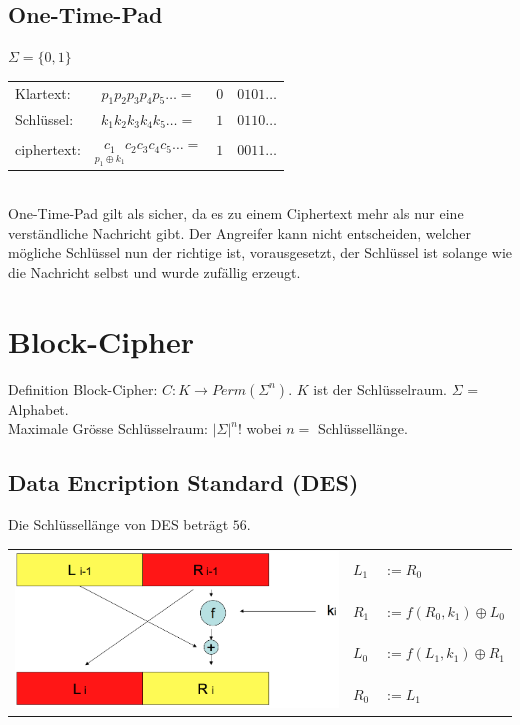 \documentclass[10pt]{article}
\newcommand{\Unten}[2]{\underset{#1}{#2}} %
\begin{document}
\subsection{One-Time-Pad}
$\Sigma=\{0,1\}$
\begin{tabular}{lc|c|l}\cline{3-3}
Klartext:& $p_1p_2p_3p_4p_5\dots=$&$0$&$0101\dots$\\
Schlüssel:& $k_1k_2k_3k_4k_5\dots=$&$1$&$0110\dots$\\
ciphertext:& $\Unten{p_1\oplus k_1}{c_1}c_2c_3c_4c_5\dots=$&$1$&$0011\dots$\\\cline{3-3}
\end{tabular} \\
One-Time-Pad gilt als sicher, da es zu einem Ciphertext mehr als nur eine verständliche Nachricht gibt. Der Angreifer kann nicht entscheiden, welcher mögliche Schlüssel nun der richtige ist, vorausgesetzt, der Schlüssel ist solange wie die Nachricht selbst und wurde zufällig erzeugt.

\newpage
\section{Block-Cipher}
Definition Block-Cipher: $C: K \rightarrow Perm(\Sigma^n)$. $K$ ist der Schlüsselraum. $\Sigma$ = Alphabet.\\
Maximale Grösse Schlüsselraum: $|\Sigma|^n!$ wobei $n = $ Schlüssellänge. 
\subsection{Data Encription Standard (DES)}
Die Schlüssellänge von DES beträgt $56$.
\begin{tabular}{l | l l}
	\multirow{4}{*}{\includegraphics[scale=0.12]{horst-feistel.png}} & $L_1$ & $:= R_0$ \\
	&$R_1$ & $:= f(R_0,k_1) \oplus L_0$ \\
	&$L_0$ & $:= f(L_1,k_1) \oplus R_1$ \\
	&$R_0$ & $:= L_1$ \\
\end{tabular} \\
\end{document}
